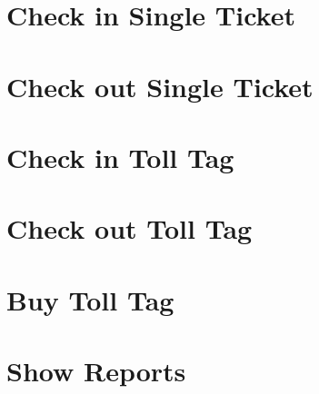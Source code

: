 \section{Check in Single Ticket}


\section{Check out Single Ticket}


\section{Check in Toll Tag}


\section{Check out Toll Tag}


\section{Buy Toll Tag}


\section{Show Reports}
